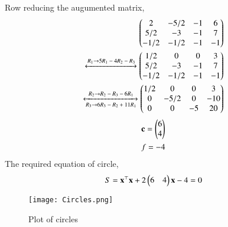 \documentclass[journal,12pt,twocolumn]{IEEEtran}
\begin{document}
Row reducing the augumented matrix,
\begin{align}
    \begin{pmatrix}2&-5/2&-1&6\\5/2&-3&-1&7\\-1/2&-1/2&-1&-1\end{pmatrix} \\ \xleftrightarrow{\text{$R_1$}\rightarrow{\text{$5R_1 - 4R_2-R_3$}}} \begin{pmatrix}1/2&0&0&3\\5/2&-3&-1&7\\-1/2&-1/2&-1&-1\end{pmatrix}\\
    \xleftrightarrow[\text{$R_3$}\rightarrow{\text{$6R_3 - R_2 + 11R_1$}} ] {\text{$R_2$}\rightarrow{\text{$R_2 - R_3 - 6R_1$}}} \begin{pmatrix}1/2&0&0&3\\0&-5/2&0&-10\\0&0&-5&20\end{pmatrix}
\end{align}
\begin{align}
    \mathbf{c} = \begin{pmatrix}6\\4\end{pmatrix}\\
    f = -4
\end{align}
The required equation of circle,
\begin{align}
    S = \mathbf{x}^\top\mathbf{x} + 2\begin{pmatrix}6&4\end{pmatrix}\mathbf{x} - 4 = 0
\end{align}
\begin{figure}[h!]
\centering
\texttt{[image: Circles.png]}
\caption{Plot of circles}
\label{fig:circles plot}
\end{figure}
\end{document}
